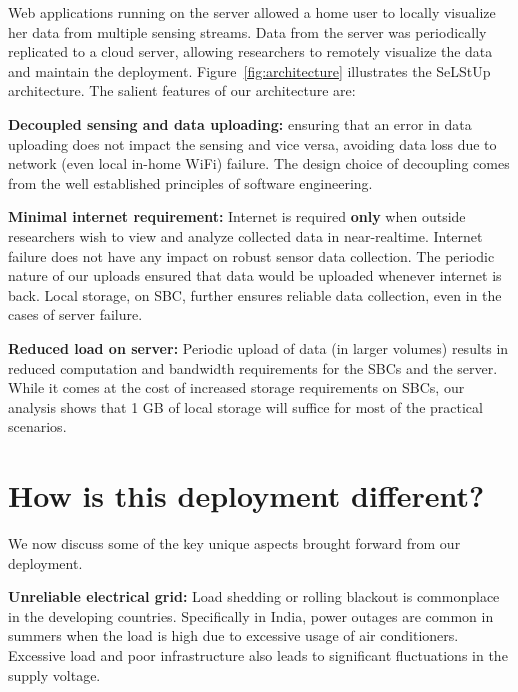 \documentclass[10pt]{sensys-proc}
\newcommand{\figref}[1]{Figure~\ref{#1}}
\newcommand{\selstups}{SeLStUp }
\begin{document}
Web applications running on the server allowed a home user to locally visualize her data from multiple sensing streams. Data from the server was periodically replicated to a cloud server, allowing researchers to remotely visualize the data and maintain the deployment. \figref{fig:architecture} illustrates the \selstups architecture. The salient features of our architecture are:


\noindent \textbf{Decoupled sensing and data uploading:} ensuring that an error in data uploading does not impact the sensing and vice versa, avoiding data loss due to network (even local in-home WiFi) failure. The design choice of decoupling comes from the well established principles of software engineering.

\noindent \textbf{Minimal internet requirement:} Internet is required \textbf{only} when outside researchers wish to view and analyze collected data in near-realtime. Internet failure does not have any impact on robust sensor data collection. The periodic nature of our uploads ensured that data would be uploaded whenever internet is back. Local storage, on SBC, further ensures reliable data collection, even in the cases of server failure. %

\noindent \textbf{Reduced load on server:} Periodic upload of data (in larger volumes) results in reduced computation and bandwidth requirements for the SBCs and the server. While it comes at the cost of increased storage requirements on SBCs, our analysis shows that 1 GB of local storage will suffice for most of the practical scenarios. %




\section{How is this deployment different?}
\label{sec:learning}
We now discuss some of the key unique aspects brought forward from our deployment. 



\noindent \textbf{Unreliable electrical grid:} Load shedding or rolling blackout is commonplace in the developing countries. %
Specifically in India, power outages are common in summers when the load is high due to excessive usage of air conditioners. Excessive load and poor infrastructure also leads to significant fluctuations in the supply voltage. %
\end{document}
